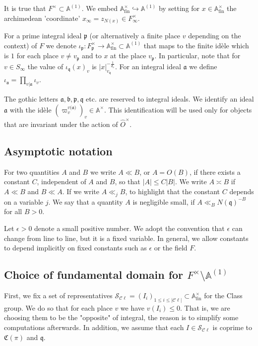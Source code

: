 \documentclass[a4paper,11pt]{amsart}
\theoremstyle{definition}
\newcommand{\A}{\mathbb{A}}
\newcommand{\cl}{\mathcal{C}\ell}
\newcommand{\fin}{\text{fin}}
\begin{document}
It is true that $F^{\times} \subset \A^{(1)}$.
We embed $\A^{\times}_{\fin} \hookrightarrow \A^{(1)}$ by setting for $x\in \A^{\times}_{\fin}$ the archimedean 'coordinate' $x_{\infty} = z_{N(x)}\in F_{\infty}^{\times}$. 

For a prime integral ideal $\mathfrak{p}$  (or alternatively a finite place $v$ depending on the context) of $F$ we denote $\iota_{\mathfrak{p}}\colon F_{\mathfrak{p}}^{\times}\to \A^{\times}_{\fin}\subset \A^{(1)}$ that maps to the finite idèle which is $1$ for each place $v\neq v_{\mathfrak{p}}$ and to $x$ at the place $v_{\mathfrak{p}}$. In particular, note that for $v\in S_{\infty}$ the value of $\iota_{\mathfrak{q}}(x)_{v}$ is $\vert{x}\vert_{v_{\mathfrak{q}}}^{-\frac{1}{d_v}}$. For an integral ideal $\mathfrak{a}$ we define $\iota_{\mathfrak{a}} = \prod_{v|\mathfrak{a}}\iota_v$. 

The gothic letters $\mathfrak{a,b,p,q}$ etc. are reserved to integral ideals. We identify an ideal $\mathfrak{a}$ with the idèle $(\varpi_v^{v(\mathfrak{a)}})_v \in \A^{\times}$. This identification will be used only for objects that are invariant under the action of $\widehat{O}^{\times}$.  

\subsection{Asymptotic notation}
For two quantities $A$ and $B$ we write $A\ll B$, or $A = O(B)$, if there exists a constant $C$, independent of $A$ and $B$, so that $\vert{A}\vert\leq C\vert{B}\vert$. We write $A\asymp B$ if $A\ll B$ and $B\ll A$. If we write $A\ll_j B$, to highlight that the constant $C$ depends on a variable $j$. We say that a quantity $A$ is negligible small, if $A\ll_B N(\mathfrak{q})^{-B}$ for all $B>0$.

Let $\epsilon >0$ denote a small positive number. We adopt the convention that $\epsilon$ can change from line to line, but it is a fixed variable.
In general, we allow constants to depend implicitly on fixed constants such as $\epsilon$ or the field $F$.  


\subsection{Choice of fundamental domain for $F^{\times}\setminus\A^{(1)}$}\label{subsec:2.choice of fundamental domain}
First, we fix a set of representatives $
    \mathcal{S}_{\cl}=(I_i)_{1\leq i \leq \vert{\cl}\vert} \subset \A_{\fin}^{\times}$ for the Class group. We do so that for each place $v$ we have $v(I_i)\leq 0$. That is, we are choosing them to be the "opposite" of integral, the reason is to simplify some computations afterwards. In addition, we assume that each $I \in \mathcal{S}_{\cl}$ is coprime to $\mathfrak{C}(\pi)$ and $\mathfrak{q}$. 
\end{document}
